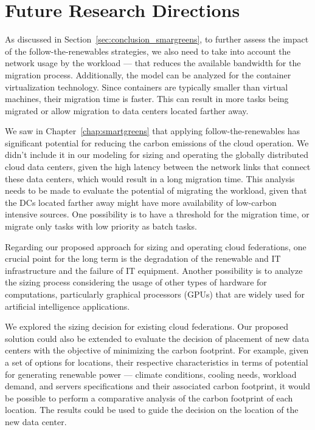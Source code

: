 \section{Future Research Directions}

\label{sec:conclusion_future_research}


As discussed in Section~\ref{sec:conclusion_smargreens}, to further assess the impact of the follow-the-renewables strategies, we also need to take into account the network usage by the workload --- that reduces the available bandwidth for the migration process. Additionally, the model can be analyzed for the container virtualization technology. Since containers are typically smaller than virtual machines, their migration time is faster. This can result in more tasks being migrated or allow migration to data centers located farther away.


We saw in Chapter~\ref{chap:smartgreens} that applying follow-the-renewables has significant potential for reducing the carbon emissions of the cloud operation. We didn't include it in our modeling for sizing and operating the globally distributed cloud data centers, given the high latency between the network links that connect these data centers, which would result in a long migration time. This analysis needs to be made to evaluate the potential of migrating the workload, given that the DCs located farther away might have more availability of low-carbon intensive sources. One possibility is to have a threshold for the migration time, or migrate only tasks with low priority as batch tasks.

Regarding our proposed approach for sizing and operating cloud federations, one crucial point for the long term is the degradation of the renewable and IT infrastructure and the failure of IT equipment. Another possibility is to analyze the sizing process considering the usage of other types of hardware for computations, particularly graphical processors (GPUs) that are widely used for artificial intelligence applications.

We explored the sizing decision for existing cloud federations. Our proposed solution could also be extended to evaluate the decision of placement of new data centers with the objective of minimizing the carbon footprint. For example, given a set of options for locations, their respective characteristics in terms of potential for generating renewable power --- climate conditions, cooling needs, workload demand, and servers specifications and their associated carbon footprint, it would be possible to perform a comparative analysis of the carbon footprint of each location. The results could be used to guide the decision on the location of the new data center.



